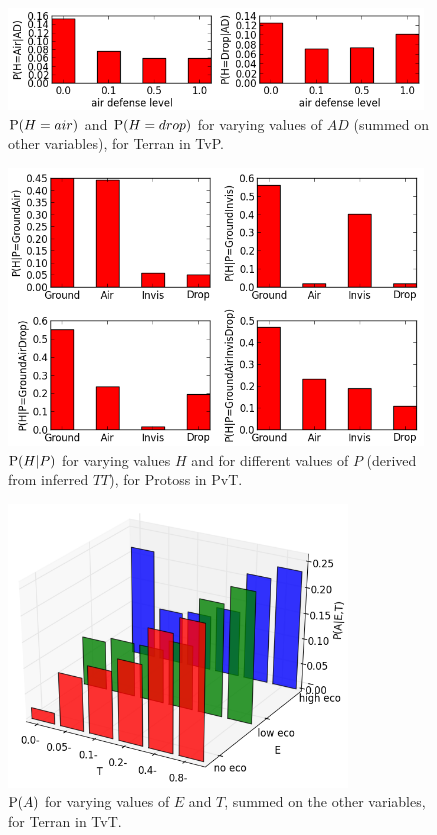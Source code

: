 \begin{figure}[htp]
\centerline{\includegraphics[width=11cm]{images/Terran_Prob_H_knowing_AD.png}}
\caption{$\mathrm{P}(H=air)$ and $\mathrm{P}(H=drop)$ for varying values of $AD$ (summed on other variables), for Terran in TvP.}
\label{fig:P_H_AD}
\end{figure}

\begin{figure}[htp]
\centerline{\includegraphics[width=11cm]{images/PossibleP.png}}
\caption{$\mathrm{P}(H|P)$ for varying values $H$ and for different values of $P$ (derived from inferred $TT$), for Protoss in PvT.}
\label{fig:PossibleP}
\end{figure}

\begin{figure}[htp]
\centerline{\includegraphics[width=9cm]{images/where3D_EI_TI_RegT.png}}
\caption{$\mathrm{P}(A)$ for varying values of $E$ and $T$, summed on the other variables, for Terran in TvT.}
\label{fig:Where3D}
\end{figure}

